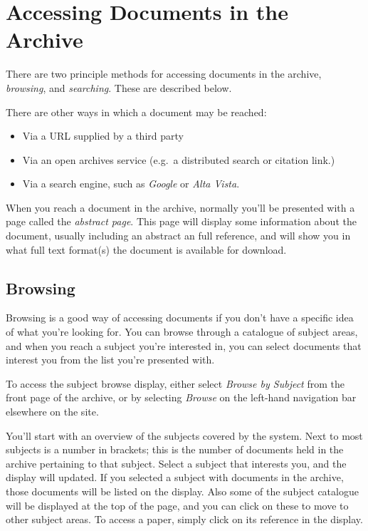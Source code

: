 
\section{Accessing Documents in the Archive}

There are two principle methods for accessing documents in the archive, \emph{browsing}, and \emph{searching}. These are described below.

There are other ways in which a document may be reached:

\begin{itemize}
\item Via a URL supplied by a third party
\item Via an open archives service (e.g.\ a distributed search or citation link.)
\item Via a search engine, such as \emph{Google} or \emph{Alta Vista}.
\end{itemize}

When you reach a document in the archive, normally you'll be presented with a page called the \emph{abstract page}. This page will display some information about the document, usually including an abstract an full reference, and will show you in what full text format(s) the document is available for download.


\subsection{Browsing}

Browsing is a good way of accessing documents if you don't have a specific idea of what you're looking for. You can browse through a catalogue of subject areas, and when you reach a subject you're interested in, you can select documents that interest you from the list you're presented with.

To access the subject browse display, either select \emph{Browse by Subject} from the front page of the archive, or by selecting \emph{Browse} on the left-hand navigation bar elsewhere on the site.

You'll start with an overview of the subjects covered by the system. Next to most subjects is a number in brackets; this is the number of documents held in the archive pertaining to that subject. Select a subject that interests you, and the display will updated. If you selected a subject with documents in the archive, those documents will be listed on the display. Also some of the subject catalogue will be displayed at the top of the page, and you can click on these to move to other subject areas. To access a paper, simply click on its reference in the display.

